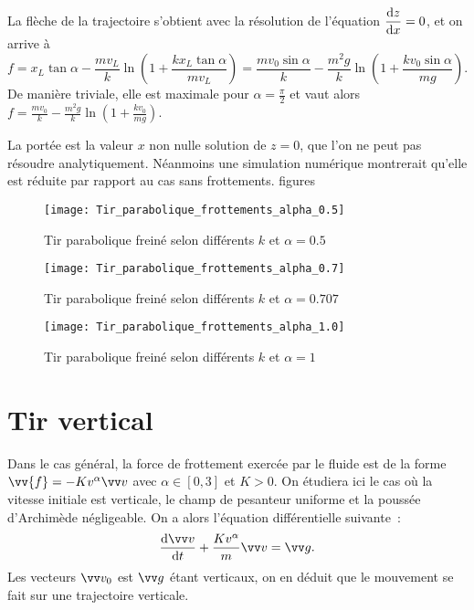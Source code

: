 La flèche de la trajectoire s'obtient avec la résolution de l'équation 
\(\dfrac{\mathrm{d} z}{\mathrm{d} x}=0\), et on arrive à
\begin{equation}%
  f = x_L \tan \alpha - \frac{mv_L}{k}\ln\left(1 + \frac{k x_L \tan \alpha}{m 
  v_L}\right) = \frac{m v_0 \sin \alpha}{k} - \frac{m^2 g}{k}\ln\left(1 + 
  \frac{k v_0 \sin \alpha}{m g}\right).
\end{equation}%
De manière triviale, elle est maximale pour \(\alpha = \frac{\pi}{2}\) et vaut 
alors \(f =  \frac{m v_0}{k} - \frac{m^2 g}{k}\ln\left(1 + \frac{k v_0}{m 
g}\right)\).

La portée est la valeur \(x\) non nulle solution de \(z=0\), que l'on ne peut 
pas
résoudre analytiquement. Néanmoins une simulation numérique montrerait qu'elle
est réduite par rapport au cas sans frottements. %
figures

\begin{figure}%
  \centering
  \texttt{[image: Tir\_parabolique\_frottements\_alpha\_0.5]}
  \caption{Tir parabolique freiné selon différents \(k\) et \(\alpha = 0.5\)}
  \label{fig:chutefrott1}%
\end{figure}%

\begin{figure}%
  \centering
  \texttt{[image: Tir\_parabolique\_frottements\_alpha\_0.7]}
  \caption{Tir parabolique freiné selon différents \(k\) et \(\alpha = 0.707\)}
  \label{fig:chutefrott2}%
\end{figure}%

\begin{figure}%
  \centering
  \texttt{[image: Tir\_parabolique\_frottements\_alpha\_1.0]}
  \caption{Tir parabolique freiné selon différents \(k\) et \(\alpha = 1\)}
  \label{fig:chutefrott3}%
\end{figure}%

\section{Tir vertical}%
\label{chap3-sec:tirvertical}%

Dans le cas général, la force de frottement exercée par le fluide est de la 
forme \(\vv{f}=-Kv^\alpha\vvv\) avec \(\alpha \in [0, 3]\) et \(K>0\). On 
étudiera ici le cas où la vitesse initiale est verticale, le champ de pesanteur 
uniforme et la poussée d'Archimède négligeable. On a alors l'équation 
différentielle suivante~:
\begin{equation}%
  \derived{\vvv}{t} + \frac{Kv^\alpha}{m}\vvv = \vg.
\end{equation}%
Les vecteurs \(\vvv_0\) est \(\vg\) étant verticaux, on en déduit que le 
mouvement se fait sur une trajectoire verticale.

